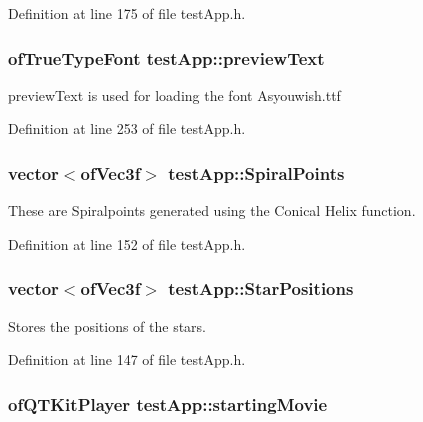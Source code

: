 Definition at line 175 of file test\-App.\-h.

\hypertarget{classtest_app_af5b1af55af2256ef3751de075fc7a9cc}{
\subsubsection[{preview\-Text}]{\setlength{\rightskip}{0pt plus 5cm}of\-True\-Type\-Font test\-App\-::preview\-Text}}\label{classtest_app_af5b1af55af2256ef3751de075fc7a9cc}


preview\-Text is used for loading the font Asyouwish.\-ttf 



Definition at line 253 of file test\-App.\-h.

\hypertarget{classtest_app_af0dd2f3e3aabdb43bee49d74c156dc05}{
\subsubsection[{Spiral\-Points}]{\setlength{\rightskip}{0pt plus 5cm}vector$<$of\-Vec3f$>$ test\-App\-::\-Spiral\-Points}}\label{classtest_app_af0dd2f3e3aabdb43bee49d74c156dc05}


These are Spiralpoints generated using the Conical Helix function. 



Definition at line 152 of file test\-App.\-h.

\hypertarget{classtest_app_a68d0d30cea64a9d39a1b2deef16677ad}{
\subsubsection[{Star\-Positions}]{\setlength{\rightskip}{0pt plus 5cm}vector$<$of\-Vec3f$>$ test\-App\-::\-Star\-Positions}}\label{classtest_app_a68d0d30cea64a9d39a1b2deef16677ad}


Stores the positions of the stars. 



Definition at line 147 of file test\-App.\-h.

\hypertarget{classtest_app_a9bfe7793fa0689a991ff64174745c38f}{
\subsubsection[{starting\-Movie}]{\setlength{\rightskip}{0pt plus 5cm}of\-Q\-T\-Kit\-Player test\-App\-::starting\-Movie}}\label{classtest_app_a9bfe7793fa0689a991ff64174745c38f}


